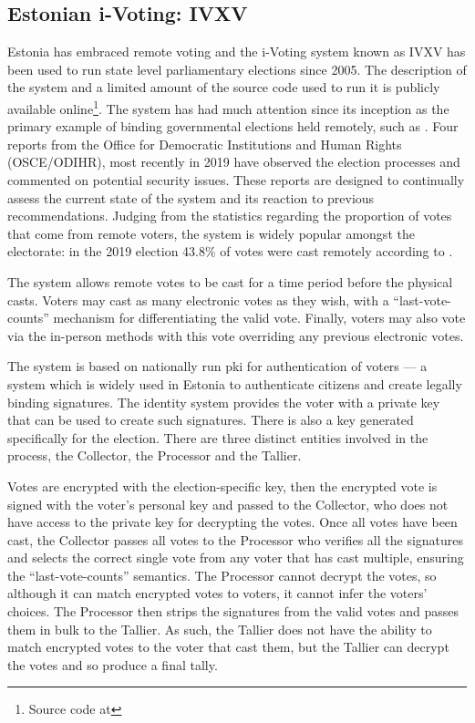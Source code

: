 \subsection{Estonian i-Voting: IVXV}
\label{ch:ev:existing:ivoting}

Estonia has embraced remote voting and the i-Voting system known as IVXV has been used to run state level parliamentary elections since 2005. The description of the system and a limited amount of the source code used to run it is publicly available online\footnote{Source code at }. The system has had much attention since its inception as the primary example of binding governmental elections held remotely, such as \cite{OSCEODIHRElection2019,SecurityAnalysisEstonian}. Four reports from the Office for Democratic Institutions and Human Rights (OSCE/ODIHR), most recently in 2019 have observed the election processes and commented on potential security issues. These reports are designed to continually assess the current state of the system and its reaction to previous recommendations. Judging from the statistics regarding the proportion of votes that come from remote voters, the system is widely popular amongst the electorate: in the 2019 election 43.8\% of votes were cast remotely according to \cite{OSCEODIHRElection2019}.

The system allows remote votes to be cast for a time period before the physical casts. Voters may cast as many electronic votes as they wish, with a ``last-vote-counts'' mechanism for differentiating the valid vote. Finally, voters may also vote via the in-person methods with this vote overriding any previous electronic votes.

The system is based on nationally run \gls{pki} for authentication of voters --- a system which is widely used in Estonia to authenticate citizens and create legally binding signatures. The identity system provides the voter with a private key that can be used to create such signatures. There is also a key generated specifically for the election. There are three distinct entities involved in the process, the Collector, the Processor and the Tallier.

Votes are encrypted with the election-specific key, then the encrypted vote is signed with the voter's personal key and passed to the Collector, who does not have access to the private key for decrypting the votes. Once all votes have been cast, the Collector passes all votes to the Processor who verifies all the signatures and selects the correct single vote from any voter that has cast multiple, ensuring the ``last-vote-counts'' semantics. The Processor cannot decrypt the votes, so although it can match encrypted votes to voters, it cannot infer the voters' choices. The Processor then strips the signatures from the valid votes and passes them in bulk to the Tallier. As such, the Tallier does not have the ability to match encrypted votes to the voter that cast them, but the Tallier can decrypt the votes and so produce a final tally.

